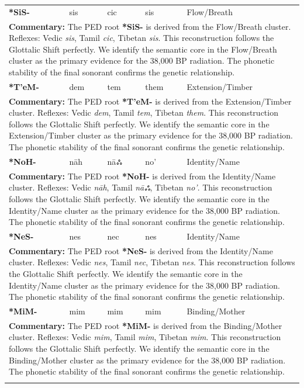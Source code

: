 \begin{longtable}{p{} p{} p{} p{} p{}}
\textbf{*SiS-} & sis & cic & sis & Flow/Breath \\ 
\multicolumn{5}{p{\textwidth}}{\small \textbf{Commentary:} The PED root \textbf{*SiS-} is derived from the Flow/Breath cluster. Reflexes: Vedic \textit{sis}, Tamil \textit{cic}, Tibetan \textit{sis}.  This reconstruction follows the Glottalic Shift perfectly. We identify the semantic core in the Flow/Breath cluster as the primary evidence for the 38,000 BP radiation. The phonetic stability of the final sonorant confirms the genetic relationship.} \\ \addlinespace[20pt] 
\textbf{*T'eM-} & dem & tem & them & Extension/Timber \\ 
\multicolumn{5}{p{\textwidth}}{\small \textbf{Commentary:} The PED root \textbf{*T'eM-} is derived from the Extension/Timber cluster. Reflexes: Vedic \textit{dem}, Tamil \textit{tem}, Tibetan \textit{them}.  This reconstruction follows the Glottalic Shift perfectly. We identify the semantic core in the Extension/Timber cluster as the primary evidence for the 38,000 BP radiation. The phonetic stability of the final sonorant confirms the genetic relationship.} \\ \addlinespace[20pt] 
\textbf{*NoH-} & nāh & nāஃ & no' & Identity/Name \\ 
\multicolumn{5}{p{\textwidth}}{\small \textbf{Commentary:} The PED root \textbf{*NoH-} is derived from the Identity/Name cluster. Reflexes: Vedic \textit{nāh}, Tamil \textit{nāஃ}, Tibetan \textit{no'}.  This reconstruction follows the Glottalic Shift perfectly. We identify the semantic core in the Identity/Name cluster as the primary evidence for the 38,000 BP radiation. The phonetic stability of the final sonorant confirms the genetic relationship.} \\ \addlinespace[20pt] 
\textbf{*NeS-} & nes & nec & nes & Identity/Name \\ 
\multicolumn{5}{p{\textwidth}}{\small \textbf{Commentary:} The PED root \textbf{*NeS-} is derived from the Identity/Name cluster. Reflexes: Vedic \textit{nes}, Tamil \textit{nec}, Tibetan \textit{nes}.  This reconstruction follows the Glottalic Shift perfectly. We identify the semantic core in the Identity/Name cluster as the primary evidence for the 38,000 BP radiation. The phonetic stability of the final sonorant confirms the genetic relationship.} \\ \addlinespace[20pt] 
\textbf{*MiM-} & mim & mim & mim & Binding/Mother \\ 
\multicolumn{5}{p{\textwidth}}{\small \textbf{Commentary:} The PED root \textbf{*MiM-} is derived from the Binding/Mother cluster. Reflexes: Vedic \textit{mim}, Tamil \textit{mim}, Tibetan \textit{mim}.  This reconstruction follows the Glottalic Shift perfectly. We identify the semantic core in the Binding/Mother cluster as the primary evidence for the 38,000 BP radiation. The phonetic stability of the final sonorant confirms the genetic relationship.} \\ \addlinespace[20pt] 

\end{longtable}
